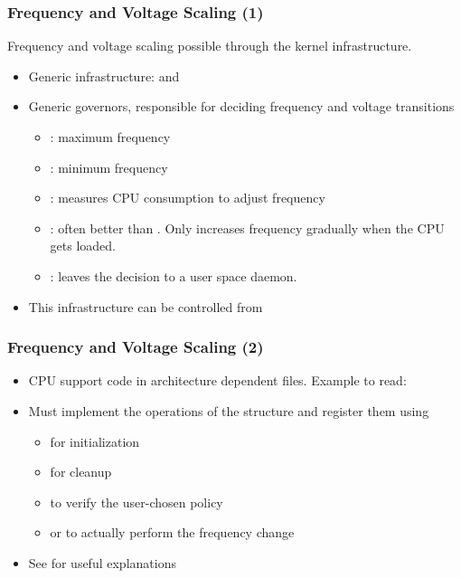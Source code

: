 \begin{frame}
  \frametitle{Frequency and Voltage Scaling (1)}
  Frequency and voltage scaling possible through the
   kernel infrastructure.
  \begin{itemize}
  \item Generic infrastructure:  and
  \item Generic governors, responsible for deciding frequency and
    voltage transitions
    \begin{itemize}
    \item {}: maximum frequency
    \item {}: minimum frequency
    \item {}: measures CPU consumption to adjust frequency
    \item {}: often better than
      . Only increases frequency gradually when the
      CPU gets loaded.
    \item {}: leaves the decision to a user space
      daemon.
    \end{itemize}
  \item This infrastructure can be controlled from
  \end{itemize}
\end{frame}

\begin{frame}
  \frametitle{Frequency and Voltage Scaling (2)}
  \begin{itemize}
  \item CPU support code in architecture dependent files.  Example to
    read: 
  \item Must implement the operations of the 
    structure and register them using 
    \begin{itemize}
    \item {} for initialization
    \item {} for cleanup
    \item {} to verify the user-chosen policy
    \item {} or  to actually perform
      the frequency change
    \end{itemize}
  \item See  for useful explanations
  \end{itemize}
\end{frame}

